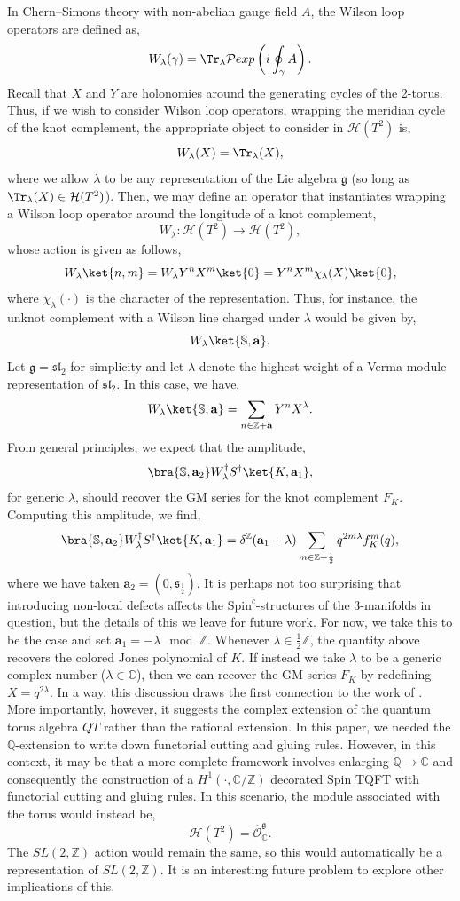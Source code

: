 \documentclass{article}
\newcommand{\Z}{{\mathbb Z}}
\newcommand{\C}{{\mathbb C}}
\newcommand{\Q}{{\mathbb Q}}
\def\be{\begin{equation}}
\def\ee{\end{equation}}
\numberwithin{corollary}{theorem}
\numberwithin{corollary}{proposition}
\begin{document}
In Chern--Simons theory with non-abelian gauge field $A$, the Wilson loop operators are defined as,
$$W_\lambda (\gamma) = \Tr_\lambda \mathcal{P}exp\left( i \oint _\gamma A\right).$$ 
Recall that $X$ and $Y$ are holonomies around the generating cycles of the 2-torus. Thus, if we wish to consider Wilson loop operators, wrapping the meridian cycle of the knot complement, the appropriate object to consider in $\mathcal{H}(T^2)$ is, 
$$W_\lambda (X) = \Tr_\lambda(X),$$
where we allow $\lambda$ to be any representation of the Lie algebra $\mathfrak{g}$ (so long as $\Tr_\lambda(X) \in \mathcal{H}(T^2)$). Then, we may define an operator that instantiates wrapping a Wilson loop operator around the longitude of a knot complement, 
$$W_\lambda : \mathcal{H}(T^2) \rightarrow \mathcal{H}(T^2),$$
whose action is given as follows,
$$W_\lambda \ket{n,m} = W_\lambda Y^n X^m\ket{0} =Y^n X^m \chi _\lambda(X)\ket{0}, $$
where $\chi_\lambda (\cdot)$ is the character of the representation. Thus, for instance, the unknot complement with a Wilson line charged under $\lambda$ would be given by,
$$W_\lambda \ket{\mathbb{S},\mathbf{a}}.$$
Let $\mathfrak{g = sl_2}$ for simplicity and let $\lambda$ denote the highest weight of a Verma module representation of $\mathfrak{sl_2}$. In this case, we have, 
$$W_\lambda \ket{\mathbb{S},\mathbf{a}} = \sum_{n\in \Z+\mathbf{a}}Y^n X^\lambda. $$
From general principles, we expect that the amplitude, 
\be \label{wilson_line_knot_complement}\bra{\mathbb{S},\mathbf{a}_2} W_\lambda ^\dagger S^\dagger \ket{K,\mathbf{a}_1},\ee
for generic $\lambda$, should recover the GM series for the knot complement $F_K$. Computing this amplitude, we find, 
$$\bra{\mathbb{S},\mathbf{a}_2} W_\lambda ^\dagger S^\dagger \ket{K,\mathbf{a}_1} = \delta^\Z(\mathbf{a}_1+\lambda) \sum_{m\in \Z+\frac{1}{2}}q^{2 m\lambda} f^m_K(q),$$
where we have taken $\mathbf{a}_2 = (0,\mathfrak{s}_{\frac{1}{2}})$. It is perhaps not too surprising that introducing non-local defects affects the $\mathrm{Spin}^c$-structures of the 3-manifolds in question, but the details of this we leave for future work. For now, we take this to be the case and set $\mathbf{a}_1 = -\lambda \mod \Z$. Whenever $\lambda \in \frac{1}{2}\Z$, the quantity above recovers the colored Jones polynomial of $K$. If instead we take $\lambda$ to be a generic complex number ($\lambda \in \C$), then we can recover the GM series $F_K$ by redefining $X=q^{2\lambda}$. In a way, this discussion draws the first connection to the work of \cite{S2}. More importantly, however, it suggests the complex extension of the quantum torus algebra $QT$ rather than the rational extension. In this paper, we needed the $\Q$-extension to write down functorial cutting and gluing rules. However, in this context, it may be that a more complete framework involves enlarging $\Q \rightarrow \C$ and consequently the construction of a $H^1(\cdot, \C/\Z)$ decorated $\mathrm{Spin}$ TQFT with functorial cutting and gluing rules. In this scenario, the module associated with the torus would instead be,
$$\boxed{\mathcal{H}(T^2) = \hat{\mathcal{O}}^\mathfrak{g}_\C.}$$
The $SL(2,\Z)$ action would remain the same, so this would automatically be a representation of $SL(2,\Z)$. It is an interesting future problem to explore other implications of this.
\end{document}

